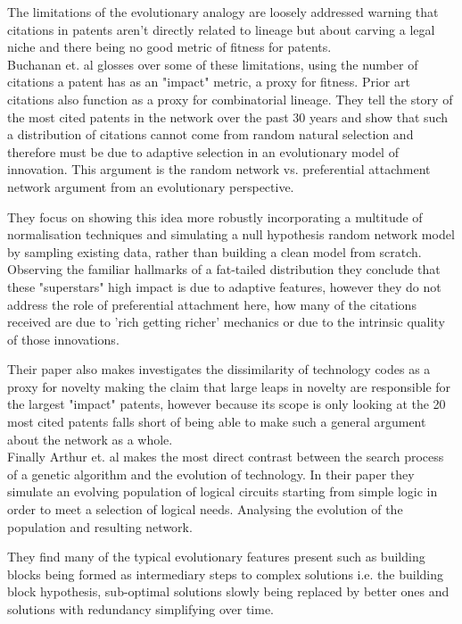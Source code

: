 \documentclass[12pt,journal,compsoc]{IEEEtran}
\begin{document}
The limitations of the evolutionary analogy are loosely addressed warning that citations in patents aren't directly related to lineage but about carving a legal niche and there being no good metric of fitness for patents. 
\\

Buchanan et. al \cite{buchanan2011measuring} glosses over some of these limitations, using the number of citations a patent has as an "impact" metric, a proxy for fitness. Prior art citations also function as a proxy for combinatorial lineage. They tell the story of the most cited patents in the network over the past 30 years and show that such a distribution of citations cannot come from random natural selection and therefore must be due to adaptive selection in an evolutionary model of innovation. This argument is the random network vs. preferential attachment network argument from an evolutionary perspective. 

They focus on showing this idea more robustly incorporating a multitude of normalisation techniques and simulating a null hypothesis random network model by sampling existing data, rather than building a clean model from scratch. Observing the familiar hallmarks of a fat-tailed distribution they conclude that these "superstars" high impact is due to adaptive features, however they do not address the role of preferential attachment here, how many of the citations received are due to 'rich getting richer' mechanics or due to the intrinsic quality of those innovations. 

Their paper also makes investigates the dissimilarity of technology codes as a proxy for novelty making the claim that large leaps in novelty are responsible for the largest "impact" patents, however because its scope is only looking at the 20 most cited patents falls short of being able to make such a general argument about the network as a whole. 
\\

Finally Arthur et. al \cite{arthur2014evolution} makes the most direct contrast between the search process of a genetic algorithm and the evolution of technology. In their paper they simulate an evolving population of logical circuits starting from simple logic in order to meet a selection of logical needs. Analysing the evolution of the population and resulting network. 

They find many of the typical evolutionary features present such as building blocks being formed as intermediary steps to complex solutions i.e. the building block hypothesis, sub-optimal solutions slowly being replaced by better ones and solutions with redundancy simplifying over time. 
\end{document}
